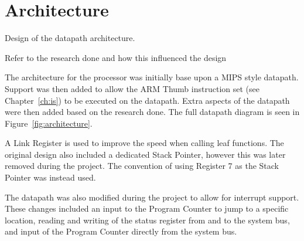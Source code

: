 

\chapter{Architecture}


Design of the datapath architecture.

Refer to the research done and how this influenced the design

The architecture for the processor was initially base upon a MIPS style datapath.
Support was then added to allow the ARM Thumb instruction set (see Chapter~\ref{ch:is}) to be executed on the datapath. 
Extra aspects of the datapath were then added based on the research done. 
The full datapath diagram is seen in Figure~\ref{fig:architecture}.

A Link Register is used to improve the speed when calling leaf functions.
The original design also included a dedicated Stack Pointer, however this was later removed during the project.
The convention of using Register 7 as the Stack Pointer was instead used. 

The datapath was also modified during the project to allow for interrupt support.
These changes included an input to the Program Counter to jump to a specific location, reading and writing of the status register from and to the system bus, and input of the Program Counter directly from the system bus. 


